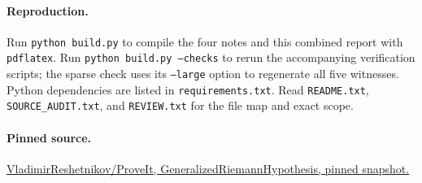\documentclass[11pt,a4paper]{article}
\begin{document}
\paragraph{Reproduction.}
Run \texttt{python build.py} to compile the four notes and this combined report with \texttt{pdflatex}. Run \texttt{python build.py --checks} to rerun the accompanying verification scripts; the sparse check uses its \texttt{--large} option to regenerate all five witnesses. Python dependencies are listed in \texttt{requirements.txt}. Read \texttt{README.txt}, \texttt{SOURCE\_AUDIT.txt}, and \texttt{REVIEW.txt} for the file map and exact scope.

\paragraph{Pinned source.}
\href{https://github.com/VladimirReshetnikov/ProveIt/tree/ce35f320bc88c02093e479f5fe5003ff86b2795f/Analysis/GeneralizedRiemannHypothesis/}{VladimirReshetnikov/ProveIt, GeneralizedRiemannHypothesis, pinned snapshot.}

\clearpage




\end{document}
